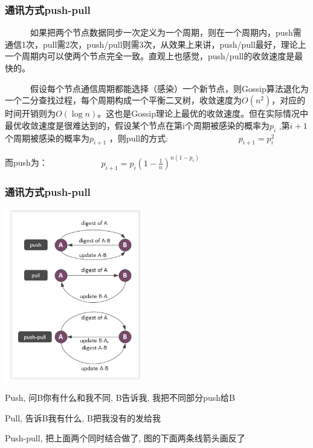 \documentclass[slidestop,compress,mathserif,c]{beamer}
\begin{document}
\begin{frame}
\frametitle{通讯方式push-pull}
 ~~~~~~如果把两个节点数据同步一次定义为一个周期，则在一个周期内，push需通信1次，pull需2次，push/pull则需3次，从效果上来讲，push/pull最好，理论上一个周期内可以使两个节点完全一致。直观上也感觉，push/pull的收敛速度是最快的。

~~~~~~假设每个节点通信周期都能选择（感染）一个新节点，则Gossip算法退化为一个二分查找过程，每个周期构成一个平衡二叉树，收敛速度为$O(n^2)$，对应的时间开销则为$O(\log n)$。这也是Gossip理论上最优的收敛速度。但在实际情况中最优收敛速度是很难达到的，假设某个节点在第i个周期被感染的概率为$p_i$ ,第$i+1$个周期被感染的概率为$p_{i+1}$ ，则pull的方式:
~~~~~~~~~~~~~~~~$ p_{i+1} =p_i^2$

而push为：~~~~~~~~~~~~
$p_{i+1}=p_i(1-\frac{1}{n})^{n(1-p_i)}$
\end{frame}

\begin{frame}
\frametitle{通讯方式push-pull}
\begin{center}
\includegraphics[width=6cm]{pushpull.jpg} 
\end{center}
Push, 问B你有什么和我不同, B告诉我, 我把不同部分push给B

Pull, 告诉B我有什么, B把我没有的发给我

Push-pull, 把上面两个同时结合做了, 图的下面两条线箭头画反了
\end{frame}
\end{document}
